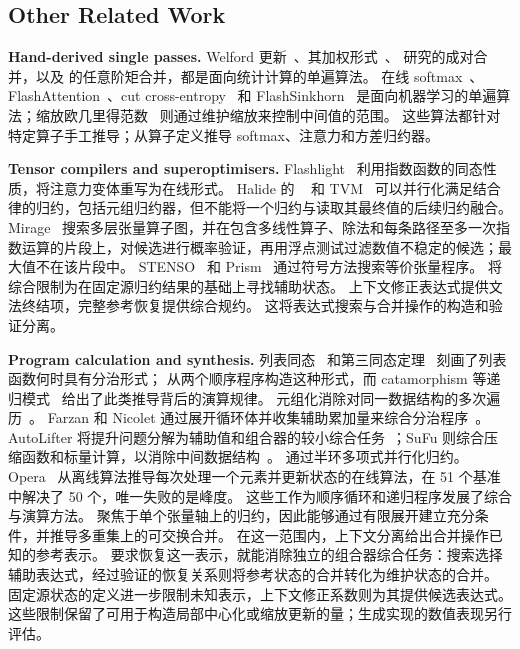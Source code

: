 \subsection{Other Related Work}

\textbf{Hand-derived single passes.}
Welford 更新~\citep{welford}、其加权形式~\citep{west}、\citet{chan} 研究的成对合并，以及 \citet{pebay} 的任意阶矩合并，都是面向统计计算的单遍算法。
在线 softmax~\citep{milakov}、FlashAttention~\citep{flashattention,flashattention2}、cut cross-entropy~\citep{cce} 和 FlashSinkhorn~\citep{flashsinkhorn} 是面向机器学习的单遍算法；缩放欧几里得范数~\citep{blue} 则通过维护缩放来控制中间值的范围。
这些算法都针对特定算子手工推导；\sys 从算子定义推导 softmax、注意力和方差归约器。

\textbf{Tensor compilers and superoptimisers.}
Flashlight~\citep{flashlight} 利用指数函数的同态性质，将注意力变体重写为在线形式。
Halide 的 ~\citep{rfactor} 和 TVM~\citep{tvm,tensorir} 可以并行化满足结合律的归约，包括元组归约器，但不能将一个归约与读取其最终值的后续归约融合。
Mirage~\citep{mirage} 搜索多层张量算子图，并在包含多线性算子、除法和每条路径至多一次指数运算的片段上，对候选进行概率验证，再用浮点测试过滤数值不稳定的候选；最大值不在该片段中。
STENSO~\citep{stenso} 和 Prism~\citep{prism} 通过符号方法搜索等价张量程序。
\sys 将综合限制为在固定源归约结果的基础上寻找辅助状态。
上下文修正表达式提供文法终结项，完整参考恢复提供综合规约。
这将表达式搜索与合并操作的构造和验证分离。

\textbf{Program calculation and synthesis.}
列表同态~\citep{bird87} 和第三同态定理~\citep{gibbons96} 刻画了列表函数何时具有分治形式；\citet{morita07} 从两个顺序程序构造这种形式，而 catamorphism 等递归模式~\citep{meijer91} 给出了此类推导背后的演算规律。
元组化消除对同一数据结构的多次遍历~\citep{bird84,pettorossi87,hu96,hu97}。
Farzan 和 Nicolet 通过展开循环体并收集辅助累加量来综合分治程序~\citep{farzan17,farzan19,farzan21}。
AutoLifter 将提升问题分解为辅助值和组合器的较小综合任务~\citep{autolifter}；SuFu 则综合压缩函数和标量计算，以消除中间数据结构~\citep{sufu}。
\citet{morihata21} 通过半环多项式并行化归约。
Opera~\citep{opera} 从离线算法推导每次处理一个元素并更新状态的在线算法，在 51 个基准中解决了 50 个，唯一失败的是峰度。
这些工作为顺序循环和递归程序发展了综合与演算方法。
\sys 聚焦于单个张量轴上的归约，因此能够通过有限展开建立充分条件，并推导多重集上的可交换合并。
在这一范围内，上下文分离给出合并操作已知的参考表示。
要求恢复这一表示，就能消除独立的组合器综合任务：搜索选择辅助表达式，经过验证的恢复关系则将参考状态的合并转化为维护状态的合并。
固定源状态的定义进一步限制未知表示，上下文修正系数则为其提供候选表达式。
这些限制保留了可用于构造局部中心化或缩放更新的量；生成实现的数值表现另行评估。

